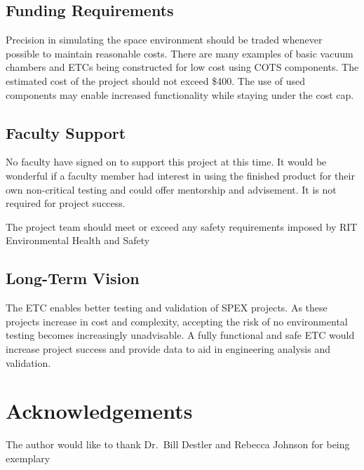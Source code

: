 \documentclass[conference]{IEEEtran} %
\begin{document}
\subsection{Funding Requirements}
  Precision in simulating the space environment should be traded whenever possible to maintain reasonable costs. There are many examples of basic vacuum chambers and ETCs being constructed for low cost using COTS components. The estimated cost of the project should not exceed \$400. The use of used components may enable increased functionality while staying under the cost cap.

\subsection{Faculty Support}
  No faculty have signed on to support this project at this time. It would be wonderful if a faculty member had interest in using the finished product for their own non-critical testing and could offer mentorship and advisement. It is not required for project success.

  The project team should meet or exceed any safety requirements imposed by RIT Environmental Health and Safety

\subsection{Long-Term Vision}
\label{sec:vision}
The ETC enables better testing and validation of SPEX projects. As these projects increase in cost and complexity, accepting the risk of no environmental testing becomes increasingly unadvisable. A fully functional and safe ETC would increase project success and provide data to aid in engineering analysis and validation.

\section*{Acknowledgements}
The author would like to thank Dr.~Bill Destler and Rebecca Johnson for being exemplary %




\end{document}
